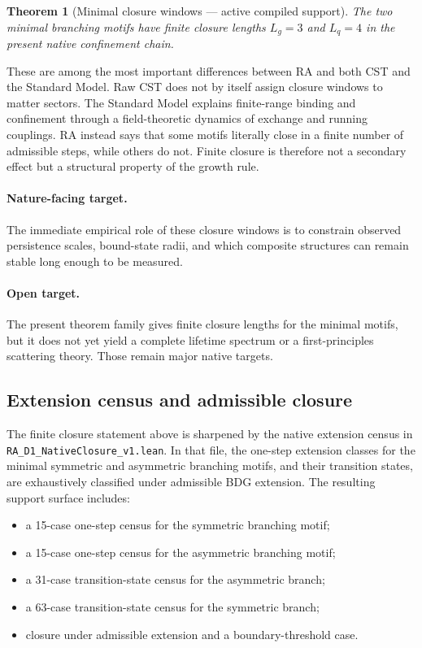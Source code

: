 \documentclass[11pt]{article}
\newtheorem{theorem}{Theorem}
\begin{document}
\begin{theorem}[Minimal closure windows --- active compiled support]
The two minimal branching motifs have finite closure lengths $L_g=3$ and $L_q=4$ in the present native confinement chain.
\end{theorem}

These are among the most important differences between RA and both CST and the Standard Model. Raw CST does not by itself assign closure windows to matter sectors. The Standard Model explains finite-range binding and confinement through a field-theoretic dynamics of exchange and running couplings. RA instead says that some motifs literally close in a finite number of admissible steps, while others do not. Finite closure is therefore not a secondary effect but a structural property of the growth rule.

\paragraph{Nature-facing target.} The immediate empirical role of these closure windows is to constrain observed persistence scales, bound-state radii, and which composite structures can remain stable long enough to be measured.

\paragraph{Open target.} The present theorem family gives finite closure lengths for the minimal motifs, but it does not yet yield a complete lifetime spectrum or a first-principles scattering theory. Those remain major native targets.

\subsection{Extension census and admissible closure}

The finite closure statement above is sharpened by the native extension census in \texttt{RA\_D1\_NativeClosure\_v1.lean}. In that file, the one-step extension classes for the minimal symmetric and asymmetric branching motifs, and their transition states, are exhaustively classified under admissible BDG extension. The resulting support surface includes:
\begin{itemize}[nosep]
    \item a 15-case one-step census for the symmetric branching motif;
    \item a 15-case one-step census for the asymmetric branching motif;
    \item a 31-case transition-state census for the asymmetric branch;
    \item a 63-case transition-state census for the symmetric branch;
    \item closure under admissible extension and a boundary-threshold case.
\end{itemize}
\end{document}
